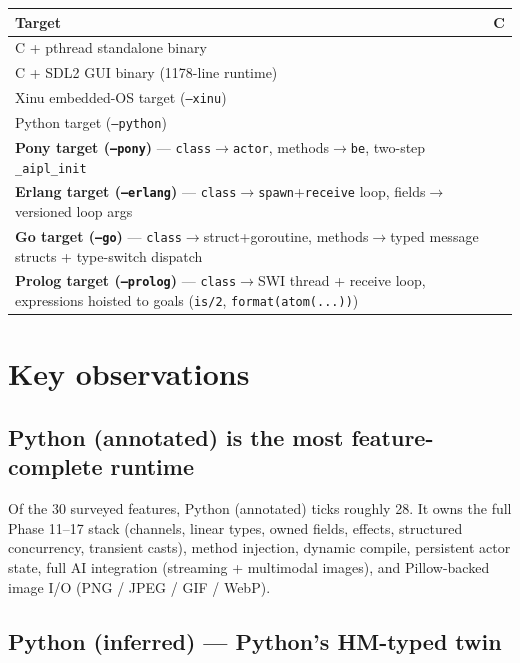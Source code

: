 \documentclass[10pt,a4paper,landscape]{article}
\newcommand{\Yes}{\textcolor{green!50!black}{\textbf{\checkmark}}}
\begin{document}
\begin{tabularx}{\linewidth}{X C}
  \toprule
  \textbf{Target} & \textbf{C} \\
  \midrule
  C + pthread standalone binary              & \Yes \\
  C + SDL2 GUI binary (1178-line runtime)    & \Yes \\
  Xinu embedded-OS target (\texttt{--xinu})  & \Yes \\
  Python target (\texttt{--python})          & \Yes \\
  \textbf{Pony target (\texttt{--pony})} — \texttt{class}$\to$\texttt{actor}, methods$\to$\texttt{be}, two-step \texttt{\_aipl\_init} & \Yes \\
  \textbf{Erlang target (\texttt{--erlang})} — \texttt{class}$\to$\texttt{spawn}+\texttt{receive} loop, fields$\to$versioned loop args & \Yes \\
  \textbf{Go target (\texttt{--go})} — \texttt{class}$\to$struct+goroutine, methods$\to$typed message structs + type-switch dispatch & \Yes \\
  \textbf{Prolog target (\texttt{--prolog})} — \texttt{class}$\to$SWI thread + receive loop, expressions hoisted to goals (\texttt{is/2}, \texttt{format(atom(...))}) & \Yes \\
  \bottomrule
\end{tabularx}

\clearpage

\section*{Key observations}

\subsection*{Python (annotated) is the most feature-complete runtime}

Of the 30 surveyed features, Python (annotated) ticks roughly 28.
It owns the full Phase 11--17 stack (channels, linear types, owned
fields, effects, structured concurrency, transient casts), method
injection, dynamic compile, persistent actor state, full AI
integration (streaming + multimodal images), and Pillow-backed
image I/O (PNG / JPEG / GIF / WebP).

\subsection*{Python (inferred) --- Python's HM-typed twin}
\end{document}
